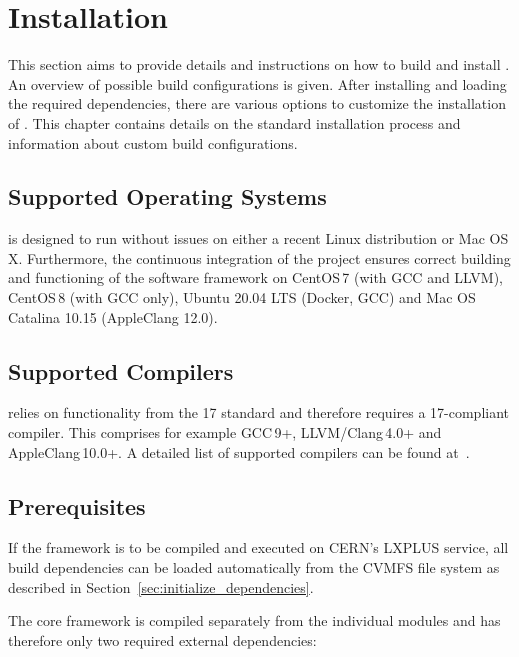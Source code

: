 \chapter{Installation}
\label{ch:installation}

This section aims to provide details and instructions on how to build and install \apsq.
An overview of possible build configurations is given.
After installing and loading the required dependencies, there are various options to customize the installation of \apsq.
This chapter contains details on the standard installation process and information about custom build configurations.


\section{Supported Operating Systems}
\label{sec:os}
\apsq is designed to run without issues on either a recent Linux distribution or Mac OS\,X.
Furthermore, the continuous integration of the project ensures correct building and functioning of the software framework on CentOS\,7 (with GCC and LLVM), CentOS\,8 (with GCC only), Ubuntu 20.04 LTS (Docker, GCC) and Mac OS Catalina 10.15 (AppleClang 12.0).

\section{Supported Compilers}
\label{sec:compilers}
\apsq relies on functionality from the {\CPP}17 standard and therefore requires a {\CPP}17-compliant compiler.
This comprises for example GCC\,9+, LLVM/Clang\,4.0+ and AppleClang\,10.0+. A detailed list of supported compilers can be found at~\cite{cppcompilersupport}.

\section{Prerequisites}
\label{sec:prerequisites}
If the framework is to be compiled and executed on CERN's LXPLUS service, all build dependencies can be loaded automatically from the CVMFS file system as described in Section~\ref{sec:initialize_dependencies}.

The core framework is compiled separately from the individual modules and \apsq has therefore only two required external dependencies:

